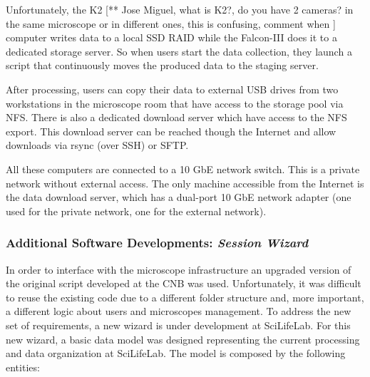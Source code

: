 Unfortunately, the K2 [** Jose Miguel, what is K2?, do you have 2 cameras? in the same microscope or in different ones, this is confusing, comment when ] computer writes data to a local SSD RAID while the Falcon-III does it to a dedicated storage server. %
So when users start the data collection, they launch a script that continuously moves the produced data to the staging server.

After processing, users can copy their data to external USB drives from two workstations in the
microscope room that have access to the storage pool via NFS.
There is also a dedicated download server which have access to the NFS export. This download server 
can be reached though the Internet and allow downloads via rsync (over SSH) or SFTP. 

All these computers are connected to a 10 GbE network switch. This is a private
network without external access. The only machine accessible from the Internet
is the data download server, which has a dual-port 10 GbE network adapter (one
used for the private network, one for the external network). %

\subsubsection{Additional Software Developments: \emph{Session Wizard}}
In order to interface \scipion with the microscope infrastructure an upgraded version of the original script developed at the CNB was used. Unfortunately, it was difficult to reuse the existing code due to a different folder structure and, more important, a different logic about users and microscopes management. To address the new set of requirements, a new wizard is under development at SciLifeLab. For this new wizard, a basic data model was designed representing the current processing and data organization at SciLifeLab. The model is composed by the following entities:

